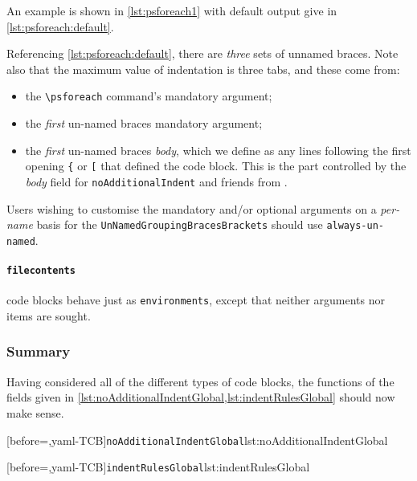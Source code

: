 		An example is shown in \cref{lst:psforeach1} with default output give in \cref{lst:psforeach:default}.

		\begin{minipage}{.45\textwidth}
		\end{minipage}%
		\hfill
		\begin{minipage}{.5\textwidth}
		\end{minipage}%

		Referencing \cref{lst:psforeach:default}, there are \emph{three} sets of unnamed braces. Note also that the maximum value
		of indentation is three tabs, and these come from:
		\begin{itemize}
			\item the \lstinline!\psforeach! command's mandatory argument;
			\item the \emph{first} un-named braces mandatory argument;
			\item the \emph{first} un-named braces \emph{body}, which we define as any lines following the first opening \lstinline!{! or \lstinline![!
			      that defined the code block.  This is the part controlled by the \emph{body} field for \texttt{noAdditionalIndent}
			      and friends from .
		\end{itemize}
		Users wishing to customise the mandatory and/or optional arguments on a \emph{per-name} basis for the \texttt{UnNamedGroupingBracesBrackets}
		should use \texttt{always-un-named}.

	\paragraph{\texttt{filecontents}} code blocks behave just as \texttt{environments}, except that neither arguments nor items are sought.

\subsubsection{Summary}
	Having considered all of the different types of code blocks, the functions of the fields given in
	\cref{lst:noAdditionalIndentGlobal,lst:indentRulesGlobal} should now make sense.

	\begin{widepage}
		\begin{minipage}{.47\linewidth}
			[before=\centering,yaml-TCB]{\texttt{noAdditionalIndentGlobal}}{lst:noAdditionalIndentGlobal}
		\end{minipage}%
		\hfill
		\begin{minipage}{.47\linewidth}
			[before=\centering,yaml-TCB]{\texttt{indentRulesGlobal}}{lst:indentRulesGlobal}
		\end{minipage}%
	\end{widepage}
